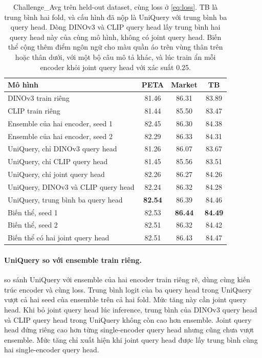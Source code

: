 \documentclass[10pt,twocolumn,letterpaper]{article}
\begin{document}
\begin{table}[t]
\centering
\small
\setlength{\tabcolsep}{3pt}
\begin{tabular}{@{}lccc@{}}
\toprule
Mô hình & PETA & Market & TB \\
\midrule
DINOv3 train riêng & 81.46 & 86.31 & 83.89 \\
CLIP train riêng & 81.44 & 85.50 & 83.47 \\
Ensemble của hai encoder, seed 1 & 82.45 & 86.30 & 84.38 \\
Ensemble của hai encoder, seed 2 & 82.29 & 86.33 & 84.31 \\
\midrule
UniQuery, chỉ DINOv3 query head & 81.26 & 86.07 & 83.67 \\
UniQuery, chỉ CLIP query head & 81.45 & 85.56 & 83.51 \\
UniQuery, chỉ joint query head & 82.26 & 86.27 & 84.26 \\
UniQuery, DINOv3 và CLIP query head & 82.24 & 86.32 & 84.28 \\
UniQuery, trung bình ba query head & \textbf{82.54} & 86.39 & 84.46 \\
\midrule
Biến thể, seed 1 & 82.53 & \textbf{86.44} & \textbf{84.49} \\
Biến thể, seed 2 & 82.51 & 86.32 & 84.42 \\
Biến thể có hai joint query head & 82.51 & 86.43 & 84.47 \\
\bottomrule
\end{tabular}
\caption{Challenge\_Avg trên held-out dataset, cùng loss ở \cref{eq:loss}. TB là trung bình hai fold, và cấu hình đã nộp là UniQuery với trung bình ba query head. Dòng DINOv3 và CLIP query head lấy trung bình hai query head này của cùng mô hình, không có joint query head. Biến thể cộng thêm điểm ngôn ngữ cho màu quần áo trên vùng thân trên hoặc thân dưới, với một bộ câu mô tả khác, và lúc train ẩn mỗi encoder khỏi joint query head với xác suất 0.25.}
\label{tab:main}
\end{table}

\paragraph{UniQuery so với ensemble train riêng.}  so sánh UniQuery với ensemble của hai encoder train riêng rẽ, dùng cùng kiến trúc encoder và cùng loss. Trung bình logit của ba query head trong UniQuery vượt cả hai seed của ensemble trên cả hai fold. Mức tăng này cần joint query head. Khi bỏ joint query head lúc inference, trung bình của DINOv3 query head và CLIP query head trong UniQuery không còn cao hơn ensemble. Joint query head đứng riêng cao hơn từng single-encoder query head nhưng cũng chưa vượt ensemble. Mức tăng chỉ xuất hiện khi joint query head được lấy trung bình cùng hai single-encoder query head.
\end{document}
